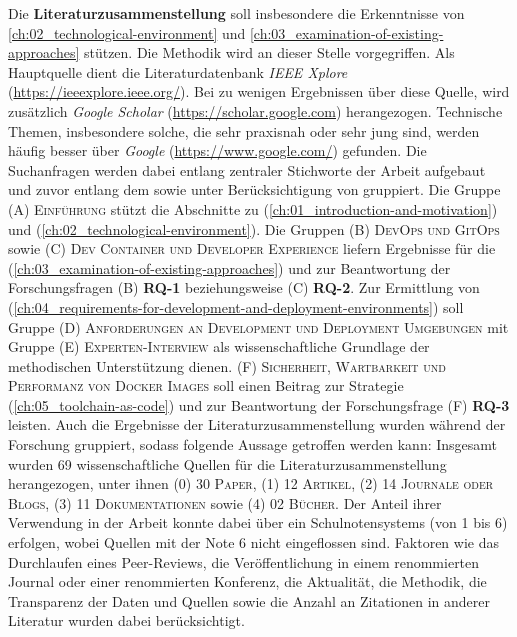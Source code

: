 Die \textbf{Literaturzusammenstellung} soll insbesondere die Erkenntnisse von \autoref{ch:02_technological-environment} und \autoref{ch:03_examination-of-existing-approaches} stützen. Die Methodik wird an dieser Stelle vorgegriffen. Als Hauptquelle dient die Literaturdatenbank \textit{IEEE Xplore} (\url{https://ieeexplore.ieee.org/}). Bei zu wenigen Ergebnissen über diese Quelle, wird zusätzlich \textit{Google Scholar} (\url{https://scholar.google.com}) herangezogen. Technische Themen, insbesondere solche, die sehr praxisnah oder sehr jung sind, werden häufig besser über \textit{Google} (\url{https://www.google.com/}) gefunden. Die Suchanfragen werden dabei entlang zentraler Stichworte der Arbeit aufgebaut und zuvor entlang dem  sowie unter Berücksichtigung von  gruppiert. Die Gruppe \textsc{(A) Einführung} stützt die Abschnitte zu  (\autoref{ch:01_introduction-and-motivation}) und  (\autoref{ch:02_technological-environment}). Die Gruppen \textsc{(B) DevOps und GitOps} sowie \textsc{(C) Dev Container und Developer Experience} liefern Ergebnisse für die  (\autoref{ch:03_examination-of-existing-approaches}) und zur Beantwortung der Forschungsfragen \textsc{(B)} \textbf{RQ-1} beziehungsweise \textsc{(C)} \textbf{RQ-2}. Zur Ermittlung von  (\autoref{ch:04_requirements-for-development-and-deployment-environments}) soll Gruppe \textsc{(D) Anforderungen an Development und Deployment Umgebungen} mit Gruppe \textsc{(E) Experten-Interview} als wissenschaftliche Grundlage der methodischen Unterstützung dienen. \textsc{(F) Sicherheit, Wartbarkeit und Performanz von Docker Images} soll einen Beitrag zur  Strategie (\autoref{ch:05_toolchain-as-code}) und zur Beantwortung der Forschungsfrage \textsc{(F)} \textbf{RQ-3} leisten. Auch die Ergebnisse der Literaturzusammenstellung wurden während der Forschung gruppiert, sodass folgende Aussage getroffen werden kann: Insgesamt wurden 69 wissenschaftliche Quellen für die Literaturzusammenstellung herangezogen, unter ihnen \textsc{(0)} 30 \textsc{Paper}, \textsc{(1)} 12 \textsc{Artikel}, \textsc{(2)} 14 \textsc{Journale oder Blogs}, \textsc{(3)} 11 \textsc{Dokumentationen} sowie \textsc{(4)} 02 \textsc{Bücher}. Der Anteil ihrer Verwendung in der Arbeit konnte dabei über ein Schulnotensystems (von 1 bis 6) erfolgen, wobei Quellen mit der Note 6 nicht eingeflossen sind. Faktoren wie das Durchlaufen eines Peer-Reviews, die Veröffentlichung in einem renommierten Journal oder einer renommierten Konferenz, die Aktualität, die Methodik, die Transparenz der Daten und Quellen sowie die Anzahl an Zitationen in anderer Literatur wurden dabei berücksichtigt.

